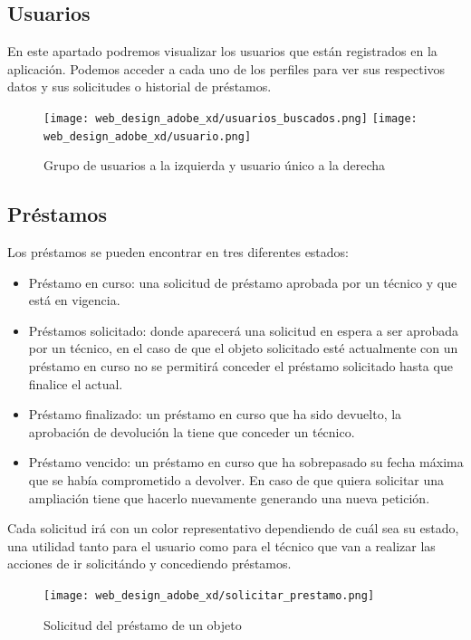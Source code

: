 \subsection{Usuarios}

En este apartado podremos visualizar los usuarios que están registrados en la aplicación. Podemos acceder a cada uno de los perfiles para ver sus respectivos datos y sus solicitudes o historial de préstamos.

\begin{figure}[H]
    \begin{center}
        \texttt{[image: web\_design\_adobe\_xd/usuarios\_buscados.png]}
        \texttt{[image: web\_design\_adobe\_xd/usuario.png]}
        \caption{Grupo de usuarios a la izquierda y usuario único a la derecha}
    \end{center}
\end{figure}

\subsection{Préstamos}

Los préstamos se pueden encontrar en tres diferentes estados:

\begin{itemize}
    \item Préstamo en curso: una solicitud de préstamo aprobada por un técnico y que está en vigencia.
    \item Préstamos solicitado: donde aparecerá una solicitud en espera a ser aprobada por un técnico, en el caso de que el objeto solicitado esté actualmente con un préstamo en curso no se permitirá conceder el préstamo solicitado hasta que finalice el actual.
    \item Préstamo finalizado: un préstamo en curso que ha sido devuelto, la aprobación de devolución la tiene que conceder un técnico.
    \item Préstamo vencido: un préstamo en curso que ha sobrepasado su fecha máxima que se había comprometido a devolver. En caso de que quiera solicitar una ampliación tiene que hacerlo nuevamente generando una nueva petición.
\end{itemize}

Cada solicitud irá con un color representativo dependiendo de cuál sea su estado, una utilidad tanto para el usuario como para el técnico que van a realizar las acciones de ir solicitándo y concediendo préstamos.

\begin{figure}[htbp]
    \centering
    \texttt{[image: web\_design\_adobe\_xd/solicitar\_prestamo.png]}
    \caption{Solicitud del préstamo de un objeto}
\end{figure}

